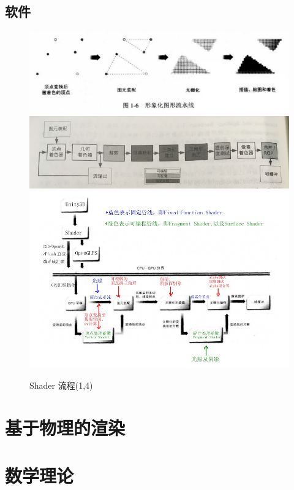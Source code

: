 \documentclass[UTF8,a4paper,12pt]{ctexbook}
\begin{document}
	\section{软件}   
		\begin{figure}[H]
			\centering
			\includegraphics[scale=0.59]{ShaderPro}
			\includegraphics[scale=0.69]{ShaderProc}
			\includegraphics[scale=0.59]{ShaderPro2}
			\caption{Shader 流程(1,4)}
		\end{figure}

\chapter{基于物理的渲染}




\chapter{数学理论}
	
\end{document}
